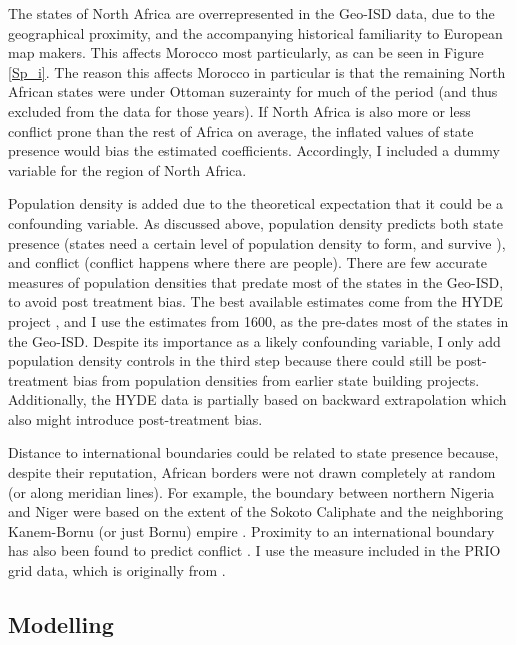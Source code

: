 \documentclass[12pt]{article}
\begin{document}
The states of North Africa are overrepresented in the Geo-ISD data, due to the
geographical proximity, and the accompanying historical familiarity to European
map makers. This affects Morocco most particularly, as can be seen in Figure
\ref{Sp_i}. The reason this affects Morocco in particular is that the remaining
North African states were under Ottoman suzerainty for much of the period (and
thus excluded from the data for those years). If North Africa is also more or
less conflict prone than the rest of Africa on average, the inflated values of
state presence would bias the estimated coefficients. Accordingly, I included a
dummy variable for the region of North Africa.

Population density is added due to the theoretical expectation that it could be
a confounding variable. As discussed above, population density predicts both
state presence (states need a certain level of population density to form, and
survive \citep{scott2017against}), and conflict (conflict happens where there
are people). There are few accurate measures of population densities that
predate most of the states in the Geo-ISD, to avoid post treatment bias. The
best available estimates come from the HYDE project \citep{Goldewijk2016}, and I
use the estimates from 1600, as the pre-dates most of the states in the Geo-ISD.
Despite its importance as a likely confounding variable, I only add population
density controls in the third step because there could still be post-treatment
bias from population densities from earlier state building projects.
Additionally, the HYDE data is partially based on backward extrapolation which
also might introduce post-treatment bias.

Distance to international boundaries could be related to state presence because,
despite their reputation, African borders were not drawn completely at random
(or along meridian lines). For example, the boundary between northern Nigeria and
Niger were based on the extent of the Sokoto Caliphate and the neighboring
Kanem-Bornu (or just Bornu) empire \citep{HiribarrenVincent2017AHoB}. Proximity
to an international boundary has also been found to predict conflict
\citep{Buhaug2002}. I use the measure included in the PRIO grid data, which is
originally from \citet{Weidmann2010a}.

\subsection{Modelling} \label{Modelling}
\end{document}
